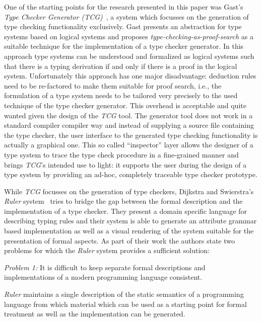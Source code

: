 \bigskip

One of the starting points for the research presented in this paper
was Gast's \textit{Type Checker Generator (TCG)}~\cite{Gast04}, a
system which focusses on the generation of type checking functionality
exclusively. Gast presents an abstraction for type systems based on
logical systems and proposes \textit{type-checking-as-proof-search} as
a suitable technique for the implementation of a type checker
generator. In this approach type systems can be understood and
formalized as logical systems such that there is a typing derivation
if and only if there is a proof in the logical system. Unfortunately
this approach has one major disadvantage: deduction rules need to be
re-factored to make them suitable for proof search, i.e., the
formulation of a type system needs to be tailored very precisely to
the used technique of the type checker generator. This overhead is
acceptable and quite wanted given the design of the \textit{TCG}
tool. The generator tool does not work in a standard compiler compiler
way and instead of supplying a source file containing the type
checker, the user interface to the generated type checking
functionality is actually a graphical one. This so called
``inspector'' layer allows the designer of a type system to trace the
type check procedure in a fine-grained manner and brings
\textit{TCG}'s intended use to light: it supports the user during the
design of a type system by providing an ad-hoc, completely traceable
type checker prototype.

\bigskip

While \textit{TCG} focusses on the generation of type checkers,
Dijkstra and Swierstra's \textit{Ruler} system~\cite{Dijkstra2006}
tries to bridge the gap between the formal description and the
implementation of a type checker. They present a domain specific
language for describing typing rules and their system is able to
generate an attribute grammar based implementation as well as a visual
rendering of the system suitable for the presentation of formal
aspects. As part of their work the authors state two problems for
which the \textit{Ruler} system provides a sufficient solution:

\smallskip
\textit{Problem 1:} It is difficult to keep separate formal
descriptions and implementations of a modern programming language
consistent.

\smallskip
\textit{Ruler} maintains a single description of the static semantics
of a programming language from which material which can be used as a
starting point for formal treatment as well as the implementation can
be generated.

